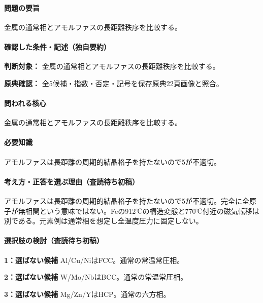 \paragraph{問題の要旨} 金属の通常相とアモルファスの長距離秩序を比較する。

\paragraph{確認した条件・記述（独自要約）}\mbox{}\par

\noindent\textbf{判断対象：} 金属の通常相とアモルファスの長距離秩序を比較する。\par

\noindent\textbf{原典確認：} 全5候補・指数・否定・記号を保存原典22頁画像と照合。\par

\paragraph{問われる核心} 金属の通常相とアモルファスの長距離秩序を比較する。

\paragraph{必要知識} アモルファスは長距離の周期的結晶格子を持たないので5が不適切。

\paragraph{考え方・正答を選ぶ理由（査読待ち初稿）} アモルファスは長距離の周期的結晶格子を持たないので5が不適切。完全に全原子が無相関という意味ではない。Feの912℃の構造変態と770℃付近の磁気転移は別である。元素例は通常相を想定し全温度圧力に固定しない。

\paragraph{選択肢の検討（査読待ち初稿）}\mbox{}\par

\noindent\textbf{1：選ばない候補} Al/Cu/NiはFCC。通常の常温常圧相。\par

\noindent\textbf{2：選ばない候補} W/Mo/NbはBCC。通常の常温常圧相。\par

\noindent\textbf{3：選ばない候補} Mg/Zn/YはHCP。通常の六方相。\par

